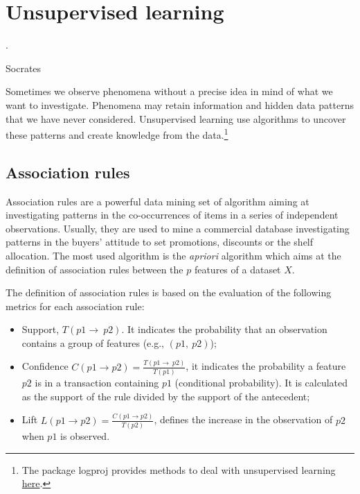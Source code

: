 \chapter{Unsupervised learning}
\label{chapUnsupervisedLearning}

\epigraph{.}{Socrates}


Sometimes we observe phenomena without a precise idea in mind of what we want to investigate. Phenomena may retain information and hidden data patterns that we have never considered. Unsupervised learning use algorithms to uncover these patterns and create knowledge from the data.\footnote{The package logproj provides methods to deal with unsupervised learning \href{https://github.com/aletuf93/logproj/blob/master/logproj/ml_unsupervised_models.py}{here}.} 

\section{Association rules} \label{secAssociationRules}
Association rules are a powerful data mining set of algorithm aiming at investigating patterns in the co-occurrences of items in a series of independent observations. Usually, they are used to mine a commercial database investigating patterns in the buyers’ attitude to set promotions, discounts or the shelf allocation. The most used algorithm is the \textit{apriori} algorithm which aims at the definition of association rules between the $p$ features of a dataset $X$.\par

The definition of association rules is based on the evaluation of the following metrics for each association rule:
\begin{itemize}
    \item Support, $T\left(p1\rightarrow\ p2\right)$. It indicates the probability that an observation contains a group of features (e.g., $(p1,\ p2)$);
    \item 	Confidence $C\left(p1\rightarrow p2\right)=\frac{T\left(p1\rightarrow\ p2\right)}{T(p1)}$, it indicates the probability a feature $p2$ is in a transaction containing $p1$ (conditional probability). It is calculated as the support of the rule divided by the support of the antecedent;
    \item 	Lift $L\left(p1\rightarrow p2\right)=\frac{C\left(p1\rightarrow p2\right)}{T(p2)}$, defines the increase in the observation of $p2$ when $p1$ is observed. 
\end{itemize}


